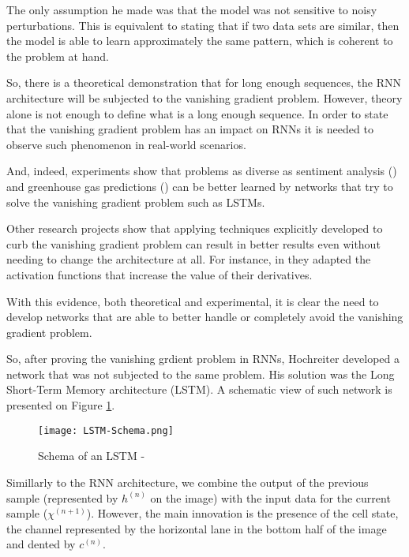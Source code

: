 The only assumption he made was that the model was not sensitive to noisy perturbations.
This is equivalent to stating that if two data sets are similar, then the model is able to learn approximately the same pattern, which is coherent to the problem at hand.

So, there is a theoretical demonstration that for long enough sequences, the RNN architecture will be subjected to the vanishing gradient problem.
However, theory alone is not enough to define what is a long enough sequence.
In order to state that the vanishing gradient problem has an impact on RNNs it is needed to observe such phenomenon in real-world scenarios. 

And, indeed, experiments show that problems as diverse as sentiment analysis (\cite{raza2021cloud}) and greenhouse gas predictions (\cite{ludwig2019comparison}) can be better learned by networks that try to solve the vanishing gradient problem such as LSTMs.

Other research projects show that applying techniques explicitly developed to curb the vanishing gradient problem can result in better results even without needing to change the architecture at all.
For instance, in \cite{hu2021handling} they adapted the activation functions that increase the value of their derivatives.

With this evidence, both theoretical and experimental, it is clear the need to develop networks that are able to better handle or completely avoid the vanishing gradient problem.

So, after proving the vanishing grdient problem in RNNs, Hochreiter developed a network that was not subjected to the same problem.
His solution was the Long Short-Term Memory architecture (LSTM).
A schematic view of such network is presented on Figure \ref{fig:LSTMSchema}.

\begin{figure}
    \begin{center}
        \texttt{[image: LSTM-Schema.png]}
        \caption[Schema of an LSTM]{Schema of an LSTM - \cite{rahman2019nonintrusive}}
        \label{fig:LSTMSchema}
    \end{center}
\end{figure}

Simillarly to the RNN architecture, we combine the output of the previous sample (represented by $h^{(n)}$ on the image) with the input data for the current sample ($\chi^{(n+1)}$).
However, the main innovation is the presence of the cell state, the channel represented by the horizontal lane in the bottom half of the image and dented by $c^{(n)}$.

